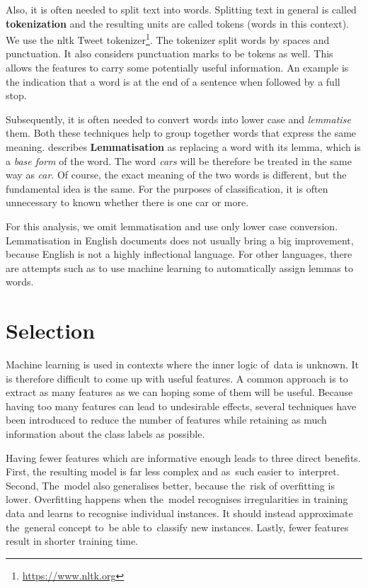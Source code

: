 Also, it is often needed to split text into words.
Splitting text in general is called {\bf tokenization} and
the resulting units are called tokens (words in this context).
We use the nltk Tweet tokenizer\footnote{\url{https://www.nltk.org}}.
The tokenizer split words by spaces and punctuation.
It also considers punctuation marks to be tokens as well.
This allows the features to carry some potentially useful information.
An example is the indication that a word is at the end of a sentence when followed by a full stop.

Subsequently, it is often needed to convert words into lower case and {\it lemmatise} them.
Both these techniques help to group together words that express the same meaning.
\citet{sammut2011encyclopedia} describes
{\bf Lemmatisation} as replacing a word with its lemma, which is a {\it base form} of the word.
The word \textit{cars} will be therefore be treated in the same way as \textit{car}.
Of course, the exact meaning of the two words is different,
but the fundamental idea is the same.
For the purposes of classification, it is often unnecessary to known whether there is one car or more.

For this analysis, we omit lemmatisation and use only lower case conversion.
Lemmatisation in English documents does not usually bring a big improvement,
because English is not a highly inflectional language.
For other languages, there are attempts such as \citet{jurvsic2010lemmagen}
to use machine learning to automatically assign lemmas to words.

\section{Selection}

Machine learning is used in contexts where the inner logic of~data is unknown.
It is therefore difficult to come up with useful features.
A common approach is to extract as many features as we can hoping some of them will be useful.
Because having too many features can lead to undesirable effects,
several techniques have been introduced to reduce the number of features
while retaining as much information about the class labels as possible.

Having fewer features which are informative enough leads to three direct benefits.
First, the resulting model is far less complex and as~such easier to~interpret.
Second, The~model also generalises better, because the~risk of overfitting is lower.
Overfitting happens when the~model recognises irregularities in training data
and learns to recognise individual instances.
It should instead approximate the~general concept to~be able to~classify new instances.
Lastly, fewer features result in shorter training time.

